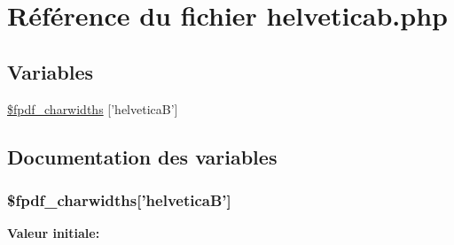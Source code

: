 \hypertarget{helveticab_8php}{
\section{R\'{e}f\'{e}rence du fichier helveticab.php}
\label{helveticab_8php}
}
\subsection*{Variables}
\begin{CompactItemize}
\item 
\hyperlink{helveticab_8php_a0}{\$fpdf\_\-charwidths} \mbox{[}'helvetica\-B'\mbox{]}
\end{CompactItemize}


\subsection{Documentation des variables}
\hypertarget{helveticab_8php_a0}{
\subsubsection[\$fpdf\_\-charwidths]{\setlength{\rightskip}{0pt plus 5cm}\$fpdf\_\-charwidths\mbox{[}'helvetica\-B'\mbox{]}}}
\label{helveticab_8php_a0}


{\bf Valeur initiale:}

